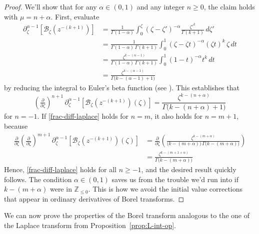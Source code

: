 \documentclass{article}
\newcommand{\Z}{\mathbb{Z}}
\newcommand{\borel}{\mathcal{B}}
\theoremstyle{definition}
\theoremstyle{plain}
\begin{document}
\begin{proof}
We'll show that for any $\alpha \in (0, 1)$ and any integer $n \ge 0$, the claim holds with $\mu = n + \alpha$. First, evaluate
\begin{align*}
\partial^{\alpha-1}_{\zeta} \left[ \borel_\zeta \left(z^{-(k+1)}\right) \right] & = \frac{1}{\Gamma(1-\alpha)} \int_0^\zeta (\zeta-\zeta')^{-\alpha} \frac{{\zeta'}^k}{\Gamma(k+1)}\,d\zeta' \\
& = \frac{1}{\Gamma(1-\alpha)\,\Gamma(k+1)} \int_0^1 (\zeta-\zeta t)^{-\alpha} (\zeta t)^k\,\zeta\,dt \\
& = \frac{\zeta^{k-(\alpha-1)}}{\Gamma(1-\alpha)\,\Gamma(k+1)} \int_0^1 (1-t)^{-\alpha} t^k\,dt \\
& = \frac{\zeta^{k-(\alpha-1)}}{\Gamma\big(k-(\alpha-1)+1\big)}
\end{align*}
by reducing the integral to Euler's beta function (see \cite[Identity 5.12.1]{dlmf}). This establishes that
\begin{equation}\label{frac-diff-laplace}
\left(\tfrac{\partial}{\partial \zeta}\right)^{n+1}\,\partial^{\alpha-1}_{\zeta } \left[ \borel_\zeta \left(z^{-(k+1)}\right)(\zeta) \right] = \frac{\zeta^{k-(n+\alpha)}}{\Gamma\big(k-(n+\alpha)+1\big)}
\end{equation}
for $n = -1$. If \eqref{frac-diff-laplace} holds for $n = m$, it also holds for $n = m+1$, because
\begin{align*}
\tfrac{\partial}{\partial \zeta} \left(\tfrac{\partial}{\partial \zeta}\right)^{m+1}\,\partial^{\alpha-1}_{\zeta} \left[ \borel_\zeta \left(z^{-(k+1)}\right)(\zeta) \right] & = \tfrac{\partial}{\partial \zeta} \left( \frac{\zeta^{k-(m+\alpha)}}{\big(k-(m+\alpha)\big)\,\Gamma\big(k-(m+\alpha)\big)} \right) \\
& = \frac{\zeta^{k-(m+1+\alpha)}}{\Gamma\big(k-(m+\alpha)\big)}
\end{align*}
Hence, \eqref{frac-diff-laplace} holds for all $n \ge -1$, and the desired result quickly follows. The condition $\alpha \in (0, 1)$ saves us from the trouble we'd run into if $k-(m+\alpha)$ were in $\Z_{\le 0}$. This is how we avoid the initial value corrections that appear in ordinary derivatives of Borel transforms.
\end{proof}
We can now prove the properties of the Borel transform analogous to the one of the Laplace transform from Proposition~\ref{prop:L-int-op}.
\end{document}
